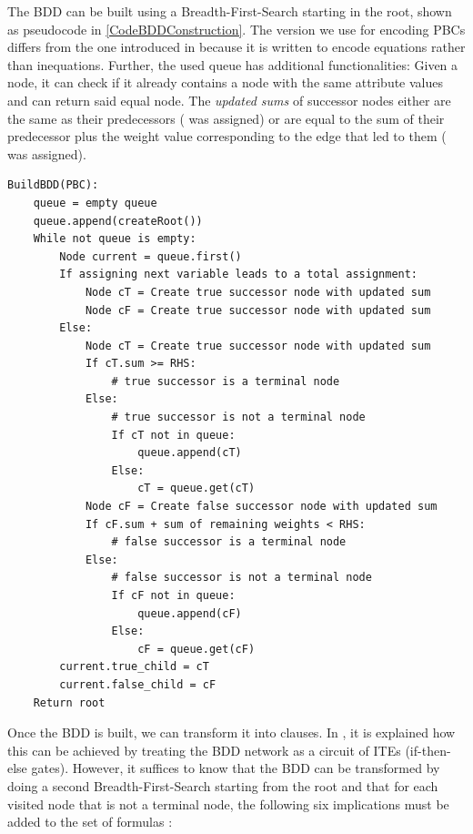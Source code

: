 The BDD can be built using a Breadth-First-Search starting in the root, shown as pseudocode in \ref{CodeBDDConstruction}. The version we use for encoding PBCs differs from the one introduced in \cite{Een2006TranslatingPC} because it is written to encode equations rather than inequations. Further, the used queue has additional functionalities: Given a node, it can check if it already contains a node with the same attribute values and can return said equal node. The \emph{updated sums} of successor nodes either are the same as their predecessors (\false{} was assigned) or are equal to the sum of their predecessor plus the weight value corresponding to the edge that led to them (\true{} was assigned).
\newpage
{
\pseudo{}
\renewcommand{\lstlistingname}{Algorithm}
\begin{lstlisting}[frame=single,caption={Pseudo Code of BDD construction},captionpos=b, label=CodeBDDConstruction, basicstyle=\footnotesize]
BuildBDD(PBC):
    queue = empty queue
    queue.append(createRoot())
    While not queue is empty:
        Node current = queue.first()
        If assigning next variable leads to a total assignment:
            Node cT = Create true successor node with updated sum
            Node cF = Create true successor node with updated sum
        Else:
            Node cT = Create true successor node with updated sum
            If cT.sum >= RHS:
                # true successor is a terminal node
            Else:
                # true successor is not a terminal node
                If cT not in queue:
                    queue.append(cT)
                Else:
                    cT = queue.get(cT)
            Node cF = Create false successor node with updated sum
            If cF.sum + sum of remaining weights < RHS:
                # false successor is a terminal node
            Else:
                # false successor is not a terminal node
                If cF not in queue:
                    queue.append(cF)
                Else:
                    cF = queue.get(cF)
        current.true_child = cT
        current.false_child = cF
    Return root
\end{lstlisting}
}
\newpage
Once the BDD is built, we can transform it into clauses. In \cite{Een2006TranslatingPC}, it is explained how this can be achieved by treating the BDD network as a circuit of ITEs (if-then-else gates). However, it suffices to know that the BDD can be transformed by doing a second Breadth-First-Search starting from the root and that for each visited node that is not a terminal node, the following six implications must be added to the set of formulas \cite{Een2006TranslatingPC}:

